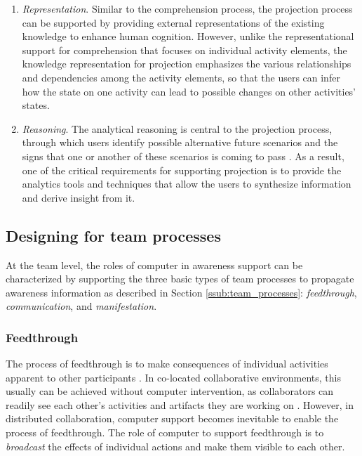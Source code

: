 \begin{enumerate}
   \item \emph{Representation}. Similar to the comprehension process, the projection process can be supported by providing external representations of the existing knowledge to enhance human cognition. However, unlike the representational support for comprehension that focuses on individual activity elements, the knowledge representation for projection emphasizes the various relationships and dependencies among the activity elements, so that the users can infer how the state on one activity can lead to possible changes on other activities' states.
   \item \emph{Reasoning}. The analytical reasoning is central to the projection process, through which users identify possible alternative future scenarios and the signs that one or another of these scenarios is coming to pass \cite{Thomas2006}. As a result, one of the critical requirements for supporting projection is to provide the analytics tools and techniques that allow the users to synthesize information and derive insight from it.
\end{enumerate}


\subsection{Designing for team processes} %
\label{sub:designing_for_the_team}
At the team level, the roles of computer in awareness support can be characterized by supporting the three basic types of team processes to propagate awareness information as described in Section \ref{ssub:team_processes}: \emph{feedthrough}, \emph{communication}, and \emph{manifestation}.

\subsubsection*{Feedthrough} %
\label{ssub:feedthrough}
The process of feedthrough is to make consequences of individual activities apparent to other participants \cite{dourish1992awareness}. In co-located collaborative environments, this usually can be achieved without computer intervention, as collaborators can readily see each other's activities and artifacts they are working on \cite{schmidt2002a}. However, in distributed collaboration, computer support becomes inevitable to enable the process of feedthrough. The role of computer to support feedthrough is to \emph{broadcast} the effects of individual actions and make them visible to each other.
